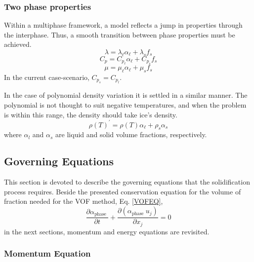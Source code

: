\subsubsection*{Two phase properties}
\setlength{\parindent}{0.5cm} Within a multiphase framework, a model reflects a jump in properties through the interphase. Thus, a smooth transition between phase properties must be achieved.
\begin{equation}
	\lambda=\lambda_{\ell} \alpha_{\ell}+\lambda_{s} f_{s}
	\label{3.35}
\end{equation}
\begin{equation}
	C_{p}=C_{p_{\ell}} \alpha_{\ell}+C_{p_{s}} f_{s}
	\label{3.36}
\end{equation}
\begin{equation}
	\mu=\mu_{\ell} \alpha_{\ell}+\mu_{s} f_{s}
	\label{3.37}
\end{equation}
In the current case-scenario, $C_{p_{s}}=C_{p_{l}}$.

\noindent In the case of polynomial density variation it is settled in a similar manner. The polynomial is not thought to suit negative temperatures, and when the problem is within this range, the density should take ice's density.
\begin{equation}
	\rho(T)^{\prime}=\rho(T) \alpha_{\ell}+\rho_{s} \alpha_{s}
	\label{3.38}
\end{equation}
where $\alpha_{l}$ and $\alpha_{s}$ are liquid and solid volume fractions, respectively.		
\subsection{Governing Equations}

\setlength{\parindent}{0.5cm} This section is devoted to describe the governing equations that the solidification process requires. Beside the presented conservation equation for the volume of fraction needed for the VOF method, Eq. \ref{VOFEQ},
\begin{equation}
	\frac{\partial \alpha_{\text {phase }}}{\partial t}+\frac{\partial\left(\alpha_{\text {phase }} u_{j}\right)}{\partial x_{j}}=0
	\label{VOFEQ}
\end{equation}
in the next sections, momentum and energy equations are revisited.

\subsubsection{Momentum Equation}

